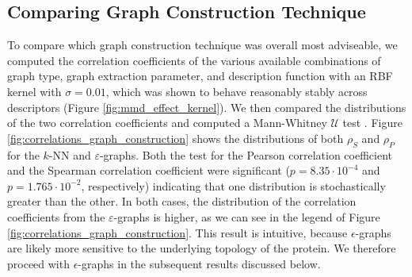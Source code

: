 \subsection{Comparing Graph Construction Technique}\label{sec:techniques}
To compare which graph construction technique was overall most adviseable, we
computed the correlation coefficients of the various available combinations of
graph type, graph extraction parameter, and description function with an RBF
kernel with $\sigma=0.01$, which was shown to behave reasonably stably across
descriptors (Figure \ref{fig:mmd_effect_kernel}). We then compared the
distributions of the two correlation coefficients and computed a Mann-Whitney
$\mathcal{U}$ test \citep{fay2010wilcoxon}. Figure
\ref{fig:correlations_graph_construction} shows the distributions of both
$\rho_S$ and $\rho_P$ for the $k$-NN and $\varepsilon$-graphs. Both the test for
the Pearson correlation coefficient and the Spearman correlation coefficient
were significant ($p=8.35\cdot 10^{-4}$ and $p=1.765\cdot 10^{-2}$,
respectively) indicating that one distribution is stochastically greater than
the other. In both cases, the distribution of the correlation coefficients from
the $\varepsilon$-graphs is higher, as we can see in the legend of Figure
\ref{fig:correlations_graph_construction}. This result is intuitive, because
$\epsilon$-graphs are likely more sensitive to the underlying topology of the
protein. We therefore proceed with $\epsilon$-graphs in the subsequent results
discussed below.

